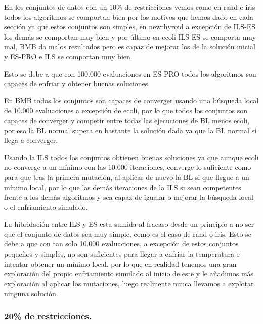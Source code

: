 \documentclass[12pt, spanish]{article}
\begin{document}
En los conjuntos de datos con un 10\% de restricciones vemos como en rand e iris todos los algoritmos se comportan bien por los motivos que hemos dado en cada sección ya que estos conjuntos son simples, en newthyroid a excepción de ILS-ES los demás se comportan muy bien y por último en ecoli ILS-ES se comporta muy mal,  BMB da malos resultados pero es capaz de mejorar los de la solución inicial y ES-PRO e ILS se comportan muy bien.


Esto se debe a que con 100.000 evaluaciones en ES-PRO todos los algoritmos son capaces de enfriar y obtener buenas soluciones. 

En BMB todos los conjuntos son capaces de converger usando una búsqueda local de 10.000 evaluaciones a excepción de ecoli, por lo que todos los conjuntos son capaces de converger y competir entre todas las ejecuciones de BL menos ecoli, por eso la BL normal supera en bastante la solución dada ya que la BL normal si llega a converger.

Usando la ILS todos los conjuntos obtienen buenas soluciones ya que aunque ecoli no converge a un mínimo con las 10.000 iteraciones, converge lo suficiente como para que tras la primera mutación, al aplicar de nuevo la BL si que llegue a un mínimo local, por lo que las demás iteraciones de la ILS si sean competentes frente a los demás algoritmos y sea capaz de igualar o mejorar la búsqueda local o el enfriamiento simulado.

La hibridación entre ILS y ES esta sumida al fracaso desde un principio a no ser que el conjunto de datos sea muy simple, como es el caso de rand o iris. Esto se debe a que con tan solo 10.000 evaluaciones, a excepción de estos conjuntos pequeños y simples, no son suficientes para llegar a enfriar la temperatura e intentar obtener un mínimo local, por lo que en realidad tenemos una gran exploración del propio enfriamiento simulado al inicio de este y le añadimos más exploración al aplicar los mutaciones, luego realmente nunca llevamos a explotar ninguna solución.

\subsubsection{20\% de restricciones.}
\end{document}
